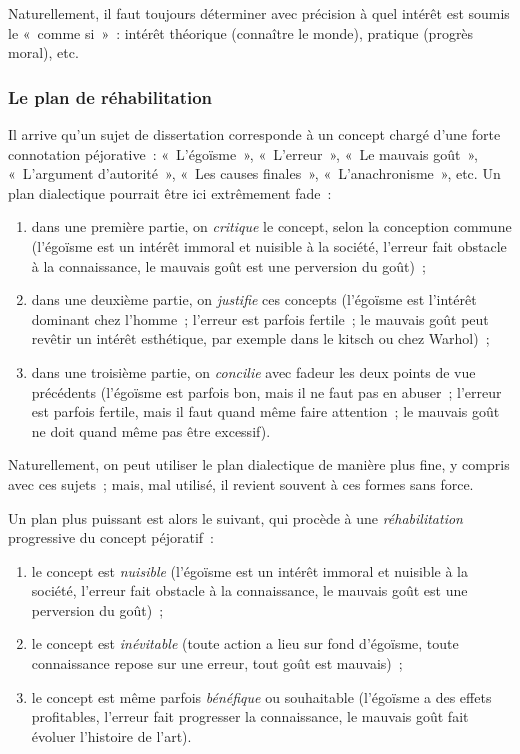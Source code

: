\documentclass[a4paper]{article}
\begin{document}
Naturellement, il faut toujours déterminer avec précision à quel intérêt
est soumis le « comme si » : intérêt théorique (connaître le monde),
pratique (progrès moral), etc.
\subsubsection{Le plan de réhabilitation}
\label{sec-3-2-3}


Il arrive qu'un sujet de dissertation corresponde à un concept chargé
d'une forte connotation péjorative : « L'égoïsme », « L'erreur », « Le
mauvais goût », « L'argument d'autorité », « Les causes finales »,
« L'anachronisme », etc. Un plan dialectique pourrait être ici extrêmement
fade :

\begin{enumerate}
\item dans une première partie, on \emph{critique} le concept, selon la
   conception commune (l'égoïsme est un intérêt immoral et nuisible à la
   société, l'erreur fait obstacle à la connaissance, le mauvais goût
   est une perversion du goût) ;
\item dans une deuxième partie, on \emph{justifie} ces concepts (l'égoïsme est
   l'intérêt dominant chez l'homme ; l'erreur est parfois fertile ; le
   mauvais goût peut revêtir un intérêt esthétique, par exemple dans le
   kitsch ou chez Warhol) ;
\item dans une troisième partie, on \emph{concilie} avec fadeur les deux points
   de vue précédents (l'égoïsme est parfois bon, mais il ne faut pas en
   abuser ; l'erreur est parfois fertile, mais il faut quand même faire
   attention ; le mauvais goût ne doit quand même pas être excessif).
\end{enumerate}

Naturellement, on peut utiliser le plan dialectique de manière plus
fine, y compris avec ces sujets ; mais, mal utilisé, il revient souvent
à ces formes sans force.

Un plan plus puissant est alors le suivant, qui procède à une
\emph{réhabilitation} progressive du concept péjoratif :

\begin{enumerate}
\item le concept est \emph{nuisible} (l'égoïsme est un intérêt immoral et
   nuisible à la société, l'erreur fait obstacle à la connaissance, le
   mauvais goût est une perversion du goût) ;
\item le concept est \emph{inévitable} (toute action a lieu sur fond d'égoïsme,
   toute connaissance repose sur une erreur, tout goût est mauvais) ;
\item le concept est même parfois \emph{bénéfique} ou souhaitable (l'égoïsme a
   des effets profitables, l'erreur fait progresser la connaissance, le
   mauvais goût fait évoluer l'histoire de l'art).
\end{enumerate}
\end{document}
